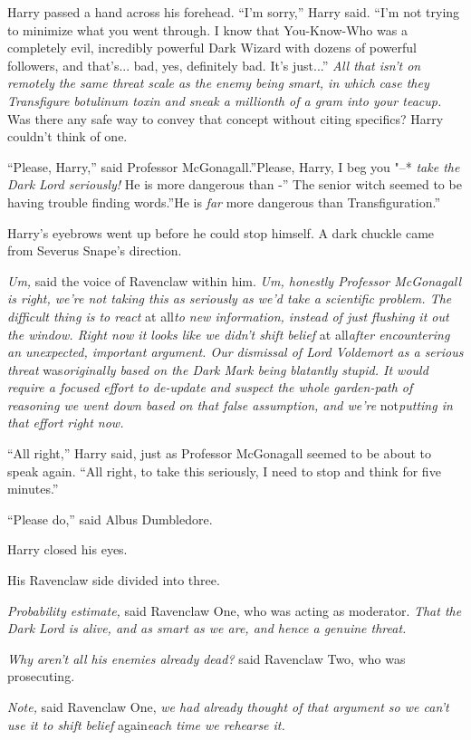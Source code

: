 Harry passed a hand across his forehead. ``I'm sorry,'' Harry said.
``I'm not trying to minimize what you went through. I know that
You-Know-Who was a completely evil, incredibly powerful Dark Wizard with
dozens of powerful followers, and that's... bad, yes, definitely
bad. It's just...'' \emph{All that isn't on remotely the same
threat scale as the enemy being smart, in which case they Transfigure
botulinum toxin and sneak a millionth of a gram into your teacup.} Was
there any safe way to convey that concept without citing specifics?
Harry couldn't think of one.

``Please, Harry,'' said Professor McGonagall.''Please, Harry, I beg you
"--* \emph{take the Dark Lord seriously!} He is more dangerous than -'' The
senior witch seemed to be having trouble finding words.''He is
\emph{far} more dangerous than Transfiguration.''

Harry's eyebrows went up before he could stop himself. A dark chuckle
came from Severus Snape's direction.

\emph{Um,} said the voice of Ravenclaw within him. \emph{Um, honestly
Professor McGonagall is right, we're not taking this as seriously as
we'd take a scientific problem. The difficult thing is to react} at
all\emph{to new information, instead of just flushing it out the window.
Right now it looks like we didn't shift belief} at all\emph{after
encountering an unexpected, important argument. Our dismissal of Lord
Voldemort as a serious threat} was\emph{originally based on the Dark
Mark being blatantly stupid. It would require a focused effort to
de-update and suspect the whole garden-path of reasoning we went down
based on that false assumption, and we're} not\emph{putting in that
effort right now.}

``All right,'' Harry said, just as Professor McGonagall seemed to be
about to speak again. ``All right, to take this seriously, I need to
stop and think for five minutes.''

``Please do,'' said Albus Dumbledore.

Harry closed his eyes.

His Ravenclaw side divided into three.

\emph{Probability estimate,} said Ravenclaw One, who was acting as
moderator. \emph{That the Dark Lord is alive, and as smart as we are,
and hence a genuine threat.}

\emph{Why aren't all his enemies already dead?} said Ravenclaw Two, who
was prosecuting.

\emph{Note,} said Ravenclaw One, \emph{we had already thought of that
argument so we can't use it to shift belief} again\emph{each time we
rehearse it.}

